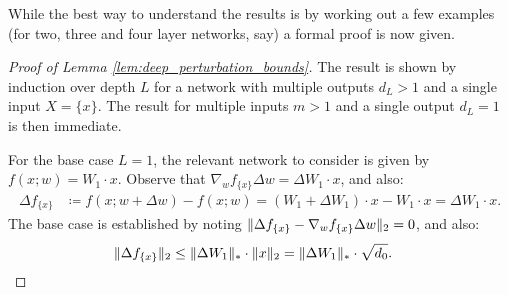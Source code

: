 \begin{refsection}
While the best way to understand the results is by working out a few examples (for two, three and four layer networks, say) a formal proof is now given.

\begin{proof}[Proof of Lemma \ref{lem:deep_perturbation_bounds}] The result is shown by induction over depth $L$ for a network with multiple outputs $d_L>1$ and a single input $X=\{x\}$. The result for multiple inputs $m>1$ and a single output $d_L=1$ is then immediate.

For the base case $L=1$, the relevant network to consider is given by $f(x;w) = W_1\cdot x.$ Observe that $\nabla_w f_{\{x\}} \Delta w = \Delta W_1 \cdot x$, and also:
\begin{align*}
    \Delta f_{\{x\}} &\coloneqq f(x;w+\Delta w) - f(x;w) = (W_1 + \Delta W_1)\cdot x - W_1\cdot x = \Delta W_1 \cdot x.
\end{align*}
The base case is established by noting $\Vert {\Delta f_{\{x\}} - \nabla_w f_{\{x\}} \Delta w} \Vert_2=0$, and also:
\begin{align*}
\Vert {\Delta f_{\{x\}}} \Vert_2 &\leq \Vert {\Delta W_1} \Vert_* \cdot \Vert {x} \Vert_2 = \Vert {\Delta W_1} \Vert_* \cdot \sqrt{d_0}.
\end{align*}


\end{proof}
\end{refsection}

